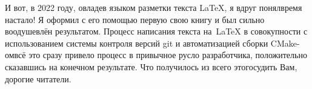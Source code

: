 {И вот, в 2022 году, овладев языком разметки текста \LaTeX, я вдруг понял\mdash время настало! Я оформил с его помощью первую свою книгу и был сильно воодушевлён результатом. Процесс написания текста на~{\LaTeX} в совокупности с использованием системы контроля версий git и автоматизацией сборки CMake-ом\mdash всё это сразу привело процесс в привычное русло разработчика, положительно сказавшись на конечном результате. Что получилось из всего этого\mdash судить Вам, дорогие читатели.
}
